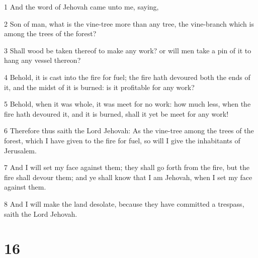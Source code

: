 \par 1 And the word of Jehovah came unto me, saying,
\par 2 Son of man, what is the vine-tree more than any tree, the vine-branch which is among the trees of the forest?
\par 3 Shall wood be taken thereof to make any work? or will men take a pin of it to hang any vessel thereon?
\par 4 Behold, it is cast into the fire for fuel; the fire hath devoured both the ends of it, and the midst of it is burned: is it profitable for any work?
\par 5 Behold, when it was whole, it was meet for no work: how much less, when the fire hath devoured it, and it is burned, shall it yet be meet for any work!
\par 6 Therefore thus saith the Lord Jehovah: As the vine-tree among the trees of the forest, which I have given to the fire for fuel, so will I give the inhabitants of Jerusalem.
\par 7 And I will set my face against them; they shall go forth from the fire, but the fire shall devour them; and ye shall know that I am Jehovah, when I set my face against them.
\par 8 And I will make the land desolate, because they have committed a trespass, saith the Lord Jehovah.

\chapter{16}

